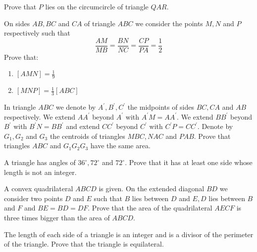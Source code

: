 \documentclass{pset}
\begin{document}
\begin{problems}
\begin{problem}
    Prove that \(P\) lies on the circumcircle of triangle \(Q A R .\)
\end{problem}

\begin{problem}
    On sides \(A B, B C\) and \(C A\) of triangle \(A B C\) we consider the points \(M, N\) and \(P\) respectively such that
    $$
    \frac{A M}{M B}=\frac{B N}{N C}=\frac{C P}{P A}=\frac{1}{2}
    $$
    Prove that:
    \begin{enumerate}
        \item $[A M N]=\frac{1}{9}$
        \item $[M N P]=\frac{1}{3}[A B C]$
    \end{enumerate}
\end{problem}

\begin{problem}
    In triangle \(A B C\) we denote by \(A^{\prime}, B^{\prime}, C^{\prime}\) the midpoints of sides \(B C, C A\) and \(A B\) respectively. We extend \(A A^{\prime}\) beyond \(A^{\prime}\) with \(A^{\prime} M=A A^{\prime} .\) We extend \(B B^{\prime}\) beyond \(B^{\prime}\) with \(B^{\prime} N=B B^{\prime}\) and extend \(C C^{\prime}\) beyond \(C^{\prime}\) with \(C^{\prime} P=C C^{\prime} .\) Denote by \(G_{1}, G_{2}\) and \(G_{3}\) the centroids of triangles \(M B C, N A C\) and \(P A B\). Prove that triangles \(A B C\) and \(G_{1} G_{2} G_{3}\) have the same area.
\end{problem}

\begin{problem}
    A triangle has angles of \(36^{\circ}, 72^{\circ}\) and \(72^{\circ} .\) Prove that it has at least one side whose length is not an integer.
\end{problem}

\begin{problem}
    A convex quadrilateral \(A B C D\) is given. On the extended diagonal \(B D\) we consider two points \(D\) and \(E\) such that \(B\) lies between \(D\) and \(E, D\) lies between \(B\) and \(F\) and \(B E=B D=D F .\) Prove that the area of the quadrilateral \(A E C F\) is three times bigger than the area of \(A B C D .\)
\end{problem}

\begin{problem}
    The length of each side of a triangle is an integer and is a divisor of the perimeter of the triangle. Prove that the triangle is equilateral.
\end{problem}



\end{problems}
\end{document}
